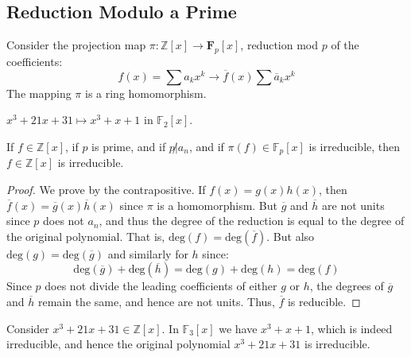 \documentclass{article}                                                        %
\begin{document}
        \subsection{Reduction Modulo a Prime}
            Consider the projection map
            $\pi:\mathbb{Z}[x]\rightarrow\mathbf{F}_{p}[x]$, reduction mod $p$
            of the coefficients:
            \begin{equation}
                f(x)=\sum{a}_{k}x^{k}\longrightarrow
                    \overline{f}(x)\sum\overline{a}_{k}x^{k}
            \end{equation}
            The mapping $\pi$ is a ring homomorphism.
            \begin{example}
                $x^{3}+21x+31\mapsto{x}^{3}+x+1$ in $\mathbb{F}_{2}[x]$.
            \end{example}
            \begin{theorem}
                If $f\in\mathbb{Z}[x]$, if $p$ is prime, and if $p\not|a_{n}$,
                and if $\pi(f)\in\mathbb{F}_{p}[x]$ is irreducible, then
                $f\in\mathbb{Z}[x]$ is irreducible.
            \end{theorem}
            \begin{proof}
                We prove by the contrapositive. If $f(x)=g(x)h(x)$, then
                $\overline{f}(x)=\overline{g}(x)\overline{h}(x)$ since $\pi$ is
                a homomorphism. But $\overline{g}$ and $\overline{h}$ are not
                units since $p$ does not $a_{n}$, and thus the degree of the
                reduction is equal to the degree of the original polynomial.
                That is, $\textrm{deg}(f)=\textrm{deg}(\overline{f})$. But also
                $\textrm{deg}(g)=\textrm{deg}(\overline{g})$ and similarly for
                $h$ since:
                \begin{equation}
                    \textrm{deg}(\overline{g})+\textrm{deg}(\overline{h})
                    =\textrm{deg}(g)+\textrm{deg}(h)=\textrm{deg}(f)
                \end{equation}
                Since $p$ does not divide the leading coefficients of either
                $g$ or $h$, the degrees of $\overline{g}$ and $\overline{h}$
                remain the same, and hence are not units. Thus, $\overline{f}$
                is reducible.
            \end{proof}
            \begin{example}
                Consider $x^{3}+21x+31\in\mathbb{Z}[x]$. In $\mathbb{F}_{3}[x]$
                we have $x^{3}+x+1$, which is indeed irreducible, and hence
                the original polynomial $x^{3}+21x+31$ is irreducible.
            \end{example}
\end{document}
